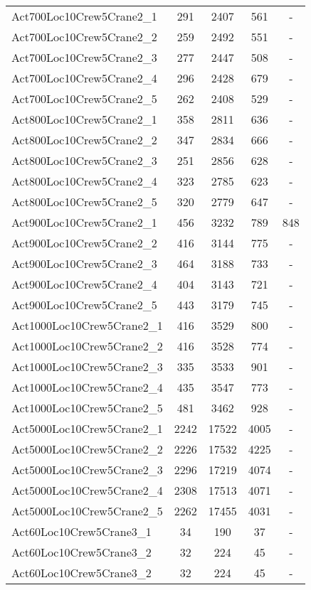 \begin{center}
\begin{longtable}{ | l | c | c | c | c | }
Act700Loc10Crew5Crane2\_1	&	291	&	2407	&	561	&	-	\\	
Act700Loc10Crew5Crane2\_2	&	259	&	2492	&	551	&	-	\\	
Act700Loc10Crew5Crane2\_3	&	277	&	2447	&	508	&	-	\\	
Act700Loc10Crew5Crane2\_4	&	296	&	2428	&	679	&	-	\\	
Act700Loc10Crew5Crane2\_5	&	262	&	2408	&	529	&	-	\\	
Act800Loc10Crew5Crane2\_1	&	358	&	2811	&	636	&	-	\\	
Act800Loc10Crew5Crane2\_2	&	347	&	2834	&	666	&	-	\\	
Act800Loc10Crew5Crane2\_3	&	251	&	2856	&	628	&	-	\\	
Act800Loc10Crew5Crane2\_4	&	323	&	2785	&	623	&	-	\\	
Act800Loc10Crew5Crane2\_5	&	320	&	2779	&	647	&	-	\\	
Act900Loc10Crew5Crane2\_1	&	456	&	3232	&	789	&	848	\\	
Act900Loc10Crew5Crane2\_2	&	416	&	3144	&	775	&	-	\\	
Act900Loc10Crew5Crane2\_3	&	464	&	3188	&	733	&	-	\\	
Act900Loc10Crew5Crane2\_4	&	404	&	3143	&	721	&	-	\\	
Act900Loc10Crew5Crane2\_5	&	443	&	3179	&	745	&	-	\\
Act1000Loc10Crew5Crane2\_1	&	416	&	3529	&	800	&	-	\\	
Act1000Loc10Crew5Crane2\_2	&	416	&	3528	&	774	&	-	\\	
Act1000Loc10Crew5Crane2\_3	&	335	&	3533	&	901	&	-	\\	
Act1000Loc10Crew5Crane2\_4	&	435	&	3547	&	773	&	-	\\	
Act1000Loc10Crew5Crane2\_5	&	481	&	3462	&	928	&	-	\\
Act5000Loc10Crew5Crane2\_1	&	2242	&	17522	&	4005	&	-	\\	
Act5000Loc10Crew5Crane2\_2	&	2226	&	17532	&	4225	&	-	\\	
Act5000Loc10Crew5Crane2\_3	&	2296	&	17219	&	4074	&	-	\\	
Act5000Loc10Crew5Crane2\_4	&	2308	&	17513	&	4071	&	-	\\	
Act5000Loc10Crew5Crane2\_5	&	2262	&	17455	&	4031	&	-	\\ \hline
Act60Loc10Crew5Crane3\_1	&	34	&	190	&	37	& -\\
Act60Loc10Crew5Crane3\_2	&	32	&	224	&	45	& -\\
Act60Loc10Crew5Crane3\_2	&	32	&	224	&	45	& -\\

\end{longtable}
\end{center}
